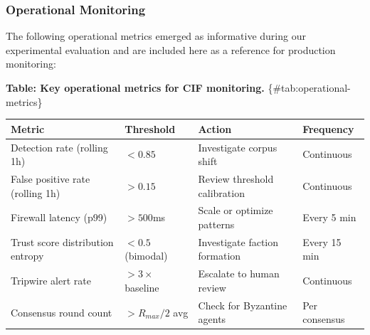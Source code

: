 \documentclass[
]{article}
\newcounter{none} %
\begin{document}
\subsubsection{Operational Monitoring}\label{sec:operational-monitoring}

The following operational metrics emerged as informative during our
experimental evaluation and are included here as a reference for
production monitoring:

\textbf{Table: Key operational metrics for CIF monitoring.}
\{\#tab:operational-metrics\}

{\def\LTcaptype{none} %
\begin{longtable}[]{@{}
  >{\raggedright\arraybackslash}p{}
  >{\raggedright\arraybackslash}p{}
  >{\raggedright\arraybackslash}p{}
  >{\raggedright\arraybackslash}p{}@{}}
\toprule\noalign{}
\begin{minipage}[b]{\linewidth}\raggedright
Metric
\end{minipage} & \begin{minipage}[b]{\linewidth}\raggedright
Threshold
\end{minipage} & \begin{minipage}[b]{\linewidth}\raggedright
Action
\end{minipage} & \begin{minipage}[b]{\linewidth}\raggedright
Frequency
\end{minipage} \\
\midrule\noalign{}
\endhead
\bottomrule\noalign{}
\endlastfoot
Detection rate (rolling 1h) & \(< 0.85\) & Investigate corpus shift &
Continuous \\
False positive rate (rolling 1h) & \(> 0.15\) & Review threshold
calibration & Continuous \\
Firewall latency (p99) & \(> 500\)ms & Scale or optimize patterns &
Every 5 min \\
Trust score distribution entropy & \(< 0.5\) (bimodal) & Investigate
faction formation & Every 15 min \\
Tripwire alert rate & \(> 3\times\) baseline & Escalate to human review
& Continuous \\
Consensus round count & \(> R_{max}/2\) avg & Check for Byzantine agents
& Per consensus \\
\end{longtable}
}
\end{document}

